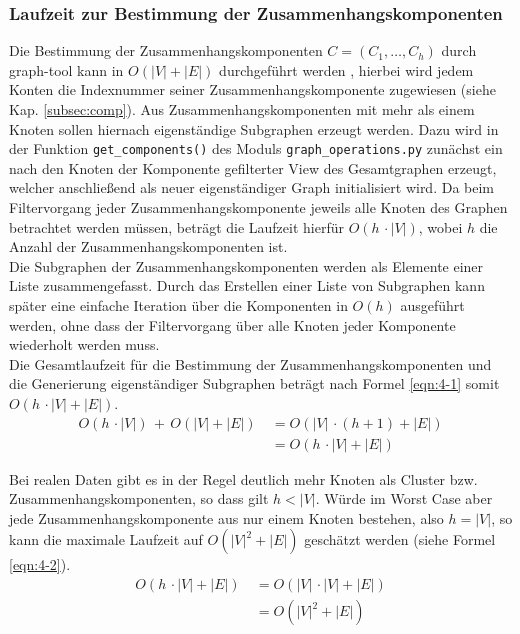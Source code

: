 \subsubsection{Laufzeit zur Bestimmung der Zusammenhangskomponenten} \label{subsec:}

Die Bestimmung der Zusammenhangskomponenten $C = (C_{1}, \dots , C_{h})$ durch graph-tool kann in $ O(|V| + |E|) $ durchgeführt werden \cite{docs_graph_tool}, hierbei wird jedem Konten die Indexnummer seiner Zusammenhangskomponente zugewiesen (siehe Kap. \ref{subsec:comp}). Aus Zusammenhangskomponenten mit mehr als einem Knoten sollen hiernach eigenständige Subgraphen erzeugt werden. Dazu wird in der Funktion \lstinline|get_components()| des Moduls \lstinline|graph_operations.py| zunächst ein nach den Knoten der Komponente gefilterter View des Gesamtgraphen erzeugt, welcher anschließend als neuer eigenständiger Graph initialisiert wird. Da beim Filtervorgang jeder Zusammenhangskomponente jeweils alle Knoten des Graphen betrachtet werden müssen, beträgt die Laufzeit hierfür $ O(h \, \cdotp |V|) $, wobei $h$ die Anzahl der Zusammenhangskomponenten ist. \\

Die Subgraphen der Zusammenhangskomponenten werden als Elemente einer Liste zusammengefasst. Durch das Erstellen einer Liste von Subgraphen kann später eine einfache Iteration über die Komponenten in $ O(h) $ ausgeführt werden, ohne dass der Filtervorgang über alle Knoten jeder Komponente wiederholt werden muss. \\

Die Gesamtlaufzeit für die Bestimmung der Zusammenhangskomponenten und die Generierung eigenständiger Subgraphen beträgt nach Formel \eqref{eqn:4-1} somit $ O(h \, \cdotp |V| + |E|) $. 
\begin{equation} \label{eqn:4-1}
\tag{4-1}
\begin{aligned}
 O(h \, \cdotp |V|) \, + \, O(|V| + |E|) &\ {} = O(|V| \, \cdotp (h + 1) +|E|)\\
 &\ = O(h \, \cdotp |V| + |E|)
 \end{aligned}
\end{equation}

Bei realen Daten gibt es in der Regel deutlich mehr Knoten als Cluster bzw. Zusammenhangskomponenten, so dass gilt $ h < |V| $. Würde im Worst Case aber jede Zusammenhangskomponente aus nur einem Knoten bestehen, also $ h = |V| $, so kann die maximale Laufzeit auf $ O(|V|^2 + |E|) $ geschätzt werden (siehe Formel \eqref{eqn:4-2}).\\
\begin{equation} \label{eqn:4-2}
\tag{4-2}
\begin{aligned}
O(h \, \cdotp |V| + |E|) &\ {} = O(|V| \, \cdotp |V| + |E|)\\
&\ = O(|V|^2 + |E|) 
\end{aligned}
\end{equation}

